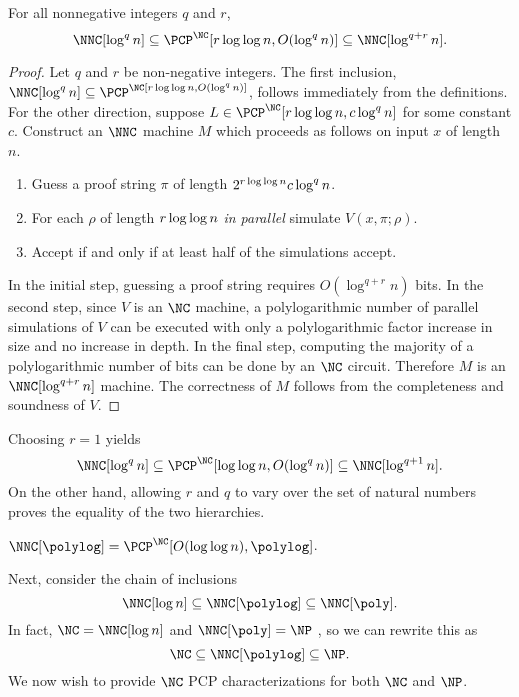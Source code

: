 \begin{theorem}\label{thm:qplusr}
  For all nonnegative integers $q$ and $r$,
  $$
    \NNC[\log^q n] \subseteq \PCP^{\NC}[r \loglog n, O(\log^q n)] \subseteq \NNC[\log^{q + r} n].
  $$
\end{theorem}
\begin{proof}
  Let $q$ and $r$ be non-negative integers.
  The first inclusion, $\NNC[\log^q n] \subseteq \PCP^\NC[r \loglog n, O(\log^q n)]$, follows immediately from the definitions.
  For the other direction, suppose $L \in \PCP^{\NC}[r \loglog n, c \log^q n]$ for some constant $c$.
  Construct an $\NNC$ machine $M$ which proceeds as follows on input $x$ of length $n$.
  \begin{enumerate}
  \item Guess a proof string $\pi$ of length $2^{r \log\log n} c \log^q n$.
  \item For each $\rho$ of length $r \log\log n$ \emph{in parallel} simulate $V(x, \pi; \rho)$.
  \item Accept if and only if at least half of the simulations accept.
  \end{enumerate}
In the initial step, guessing a proof string requires $O(\log^{q + r} n)$ bits.
In the second step, since $V$ is an $\NC$ machine, a polylogarithmic number of parallel simulations of $V$ can be executed with only a polylogarithmic factor increase in size and no increase in depth.
In the final step, computing the majority of a polylogarithmic number of bits can be done by an $\NC$ circuit.
Therefore $M$ is an $\NNC[\log^{q + r} n]$ machine.
The correctness of $M$ follows from the completeness and soundness of $V$.
\end{proof}

Choosing $r = 1$ yields
$$
\NNC[\log^q n] \subseteq \PCP^{\NC}[\loglog n, O(\log^q n)] \subseteq \NNC[\log^{q + 1} n].
$$
On the other hand, allowing $r$ and $q$ to vary over the set of natural numbers proves the equality of the two hierarchies.

\begin{corollary}\label{cor:polylogeq}
  $\NNC[\polylog] = \PCP^{\NC}[O(\loglog n), \polylog]$.
\end{corollary}

Next, consider the chain of inclusions
\begin{equation*}
  \NNC[\log n] \subseteq \NNC[\polylog] \subseteq \NNC[\poly].
\end{equation*}
In fact, $\NC = \NNC[\log n]$ and $\NNC[\poly] = \NP$ \autocite{wolf94}, so we can rewrite this as
\begin{equation}\label{eq:chain}
  \NC \subseteq \NNC[\polylog] \subseteq \NP.
\end{equation}
We now wish to provide $\NC$ PCP characterizations for both $\NC$ and $\NP$.

